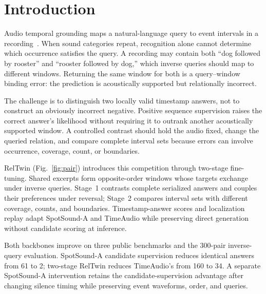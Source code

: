 \section{Introduction}
Audio temporal grounding maps a natural-language query to event intervals in a recording~\cite{xu2021grounding,munakata2025amr}. When sound categories repeat, recognition alone cannot determine which occurrence satisfies the query. A recording may contain both ``dog followed by rooster'' and ``rooster followed by dog,'' which inverse queries should map to different windows. Returning the same window for both is a query--window binding error: the prediction is acoustically supported but relationally incorrect.



The challenge is to distinguish two locally valid timestamp answers, not to construct an obviously incorrect negative. Positive sequence supervision raises the correct answer's likelihood without requiring it to outrank another acoustically supported window. A controlled contrast should hold the audio fixed, change the queried relation, and compare complete interval sets because errors can involve occurrence, coverage, count, or boundaries.

RelTwin (Fig.~\ref{fig:pair}) introduces this competition through two-stage fine-tuning. Shared excerpts form opposite-order windows whose targets exchange under inverse queries. Stage~1 contrasts complete serialized answers and couples their preferences under reversal; Stage~2 compares interval sets with different coverage, counts, and boundaries. Timestamp-answer scores and localization replay adapt SpotSound-A and TimeAudio while preserving direct generation without candidate scoring at inference.

Both backbones improve on three public benchmarks and the 300-pair inverse-query evaluation. SpotSound-A candidate supervision reduces identical answers from 61 to 2; two-stage RelTwin reduces TimeAudio's from 160 to 34. A separate SpotSound-A intervention retains the candidate-supervision advantage after changing silence timing while preserving event waveforms, order, and queries.
